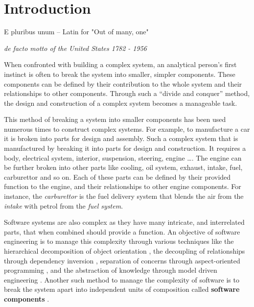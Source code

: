 \chapter{Introduction}
\label{introduction}
\epigraph{E pluribus unum -- Latin for "Out of many, one"}
{\textit{de facto motto of the United States 1782 - 1956}}

When confronted with building a complex system, an analytical person's first instinct is often to break the system into smaller, simpler components. 
These components can be defined by their contribution to the whole system and their relationships to other components.
Through such a ``divide and conquer'' method, the design and construction of a complex system becomes a manageable task.

This method of breaking a system into smaller components has been used numerous times to construct complex systems.
For example, to manufacture a car it is broken into parts for design and assembly.
Such a complex system that is manufactured by breaking it into parts for design and construction.
It requires a body, electrical system, interior, suspension, steering, engine \ldots. 
The engine can be further broken into other parts like cooling, oil system, exhaust, intake, fuel, carburettor and so on.
Each of these parts can be defined by their provided function to the engine, and their relationships to other engine components.
For instance, the \textit{carburettor} is the fuel delivery system that blends the air from the \textit{intake} with petrol from the \textit{fuel system}.

Software systems are also complex as they have many intricate, and interrelated parts, that when combined should provide a function.
An objective of software engineering is to manage this complexity through various techniques like the hierarchical decomposition of object orientation \citep{goldberg1983smalltalk}, 
the decoupling of relationships through dependency inversion \citep{martin1996dependency}, 
separation of concerns through aspect-oriented programming \citep{Kiczales1997},
and the abstraction of knowledge through model driven engineering \citep{schmidt2006}. 
Another such method to manage the complexity of software is to break the system apart into independent units of composition called \textbf{software components} \citep{Szyperski2002}. 

